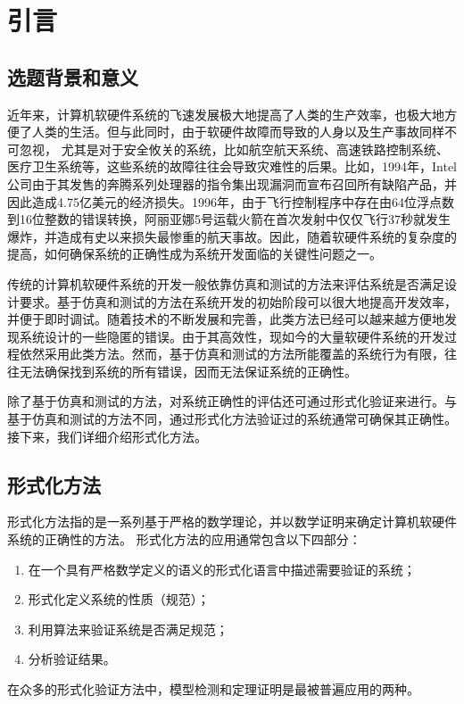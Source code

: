 \chapter{引言}\label{chapt:intro}
\section{选题背景和意义}
近年来，计算机软硬件系统的飞速发展极大地提高了人类的生产效率，也极大地方便了人类的生活。但与此同时，由于软硬件故障而导致的人身以及生产事故同样不可忽视，
尤其是对于安全攸关的系统，比如航空航天系统、高速铁路控制系统、医疗卫生系统等，这些系统的故障往往会导致灾难性的后果。比如，1994年，Intel公司由于其发售的奔腾系列处理器的指令集出现漏洞而宣布召回所有缺陷产品，并因此造成4.75亿美元的经济损失。1996年，由于飞行控制程序中存在由64位浮点数到16位整数的错误转换，阿丽亚娜5号运载火箭在首次发射中仅仅飞行37秒就发生爆炸，并造成有史以来损失最惨重的航天事故。因此，随着软硬件系统的复杂度的提高，如何确保系统的正确性成为系统开发面临的关键性问题之一。

传统的计算机软硬件系统的开发一般依靠仿真和测试的方法来评估系统是否满足设计要求。基于仿真和测试的方法在系统开发的初始阶段可以很大地提高开发效率，并便于即时调试。随着技术的不断发展和完善，此类方法已经可以越来越方便地发现系统设计的一些隐匿的错误。由于其高效性，现如今的大量软硬件系统的开发过程依然采用此类方法。然而，基于仿真和测试的方法所能覆盖的系统行为有限，往往无法确保找到系统的所有错误，因而无法保证系统的正确性。

除了基于仿真和测试的方法，对系统正确性的评估还可通过形式化验证来进行。与基于仿真和测试的方法不同，通过形式化方法验证过的系统通常可确保其正确性。接下来，我们详细介绍形式化方法。
\section{形式化方法}

形式化方法指的是一系列基于严格的数学理论，并以数学证明来确定计算机软硬件系统的正确性的方法。
形式化方法的应用通常包含以下四部分：
\begin{enumerate}
	\item 在一个具有严格数学定义的语义的形式化语言中描述需要验证的系统；
	\item 形式化定义系统的性质（规范）；
	\item 利用算法来验证系统是否满足规范；
	\item 分析验证结果。
\end{enumerate}
在众多的形式化验证方法中，模型检测和定理证明是最被普遍应用的两种。
